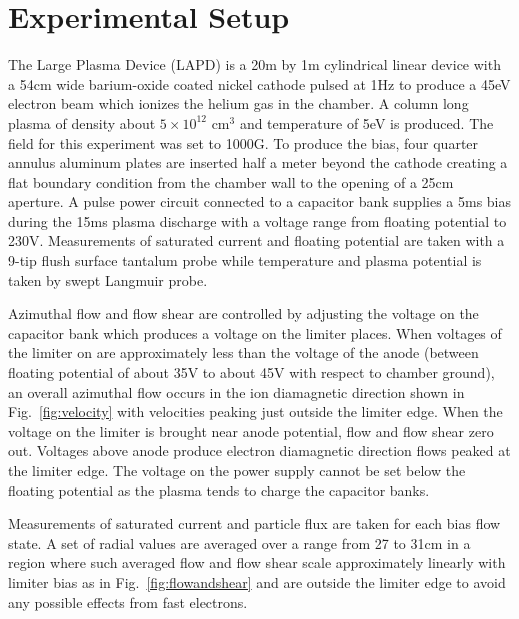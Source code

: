 \documentclass[%
 aip,
 amsmath,amssymb,
 preprint,%
]{revtex4-1}
\begin{document}
\section{Experimental Setup}

The Large Plasma Device \cite{gek91} (LAPD) is a 20m by 1m cylindrical linear device with a 54cm wide barium-oxide coated nickel cathode pulsed at 1Hz to produce a 45eV electron beam which ionizes the helium gas in the chamber. A column long plasma of density about $5 \times 10^{12}$ cm$^{3}$ and temperature of 5eV is produced. The field for this experiment was set to 1000G. To produce the bias, four quarter annulus aluminum plates are inserted half a meter beyond the cathode creating a flat boundary condition from the chamber wall to the opening of a 25cm aperture. A pulse power circuit connected to a capacitor bank supplies a 5ms bias during the 15ms plasma discharge with a voltage range from floating potential to 230V. Measurements of saturated current and floating potential are taken with a 9-tip flush surface tantalum probe while temperature and plasma potential is taken by swept Langmuir probe.

Azimuthal flow and flow shear are controlled by adjusting the voltage on the capacitor bank which produces a voltage on the limiter places. When voltages of the limiter on are approximately less than the voltage of the anode (between floating potential of about 35V to about 45V with respect to chamber ground), an overall azimuthal flow occurs in the ion diamagnetic direction shown in
Fig.~\ref{fig:velocity}%
with velocities peaking just outside the limiter edge. When the voltage on the limiter is brought near anode potential, flow and flow shear zero out. Voltages above anode produce electron diamagnetic direction flows peaked at the limiter edge. The voltage on the power supply cannot be set below the floating potential as the plasma tends to charge the capacitor banks.

Measurements of saturated current and particle flux are taken for each bias flow state. A set of radial values are averaged over a range from 27 to 31cm in a region where such averaged flow and flow shear scale approximately linearly with limiter bias as in 
Fig.~\ref{fig:flowandshear}%
and are outside the limiter edge to avoid any possible effects from fast electrons.

\end{document}
